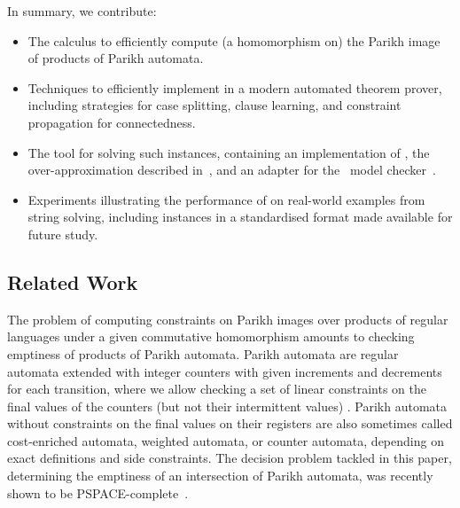 

In summary, we contribute:
\begin{itemize}
    \item The \Calculus{} calculus to efficiently compute (a homomorphism on)
          the Parikh image of products of Parikh automata.
    \item Techniques to efficiently implement \Calculus{} in a modern
    automated theorem prover, including strategies for case splitting, clause
    learning, and constraint propagation for connectedness.
    \item The \Catra{} tool for solving such instances, containing an
    implementation of \Calculus{}, the over-approximation described
    in~\cite{approximate-parikh}, and an adapter for the~\Nuxmv{} model
    checker~\cite{nuxmv}.
    \item Experiments illustrating the performance of \Calculus{} on real-world
    examples from string solving, including \NrBenchmarks{} instances in a
    standardised format made available for future study.
\end{itemize}

\subsection{Related Work}

The problem of computing constraints on Parikh images over products of regular
languages under a given commutative homomorphism amounts to checking emptiness
of products of
Parikh automata. Parikh automata are regular automata extended with integer
counters with given increments and decrements for each transition, where we
allow checking a set of linear constraints on the final values of the counters
(but not their intermittent values) \cite{parikh-automata}. Parikh automata
without constraints on the final values on their registers are also sometimes
called cost-enriched automata, weighted automata, or counter automata, depending
on exact definitions and side constraints. The decision problem tackled in this
paper, determining the emptiness of an intersection of Parikh automata, was
recently shown to be PSPACE-complete~\cite{graph-queries}.

